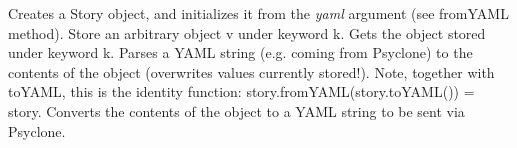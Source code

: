 \begin{interface}
    {Creates a Story object, and initializes it from the \emph{yaml} argument
      (see fromYAML method).}
    {Store an arbitrary object v under keyword k.}
    {Gets the object stored under keyword k.}
    {Parses a \ac{YAML} string (e.g. coming from Psyclone) to the contents of the
      object (overwrites values currently stored!). Note, together with toYAML,
      this is the identity function: story.fromYAML(story.toYAML()) = story.}
    {Converts the contents of the object to a \ac{YAML} string to be sent via
      Psyclone.}
\end{interface}



